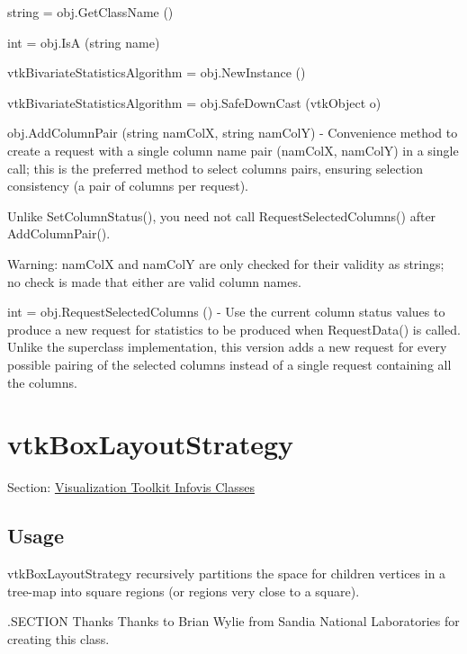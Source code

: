 \begin{DoxyItemize}
\item {\ttfamily string = obj.\-Get\-Class\-Name ()}  
\item {\ttfamily int = obj.\-Is\-A (string name)}  
\item {\ttfamily vtk\-Bivariate\-Statistics\-Algorithm = obj.\-New\-Instance ()}  
\item {\ttfamily vtk\-Bivariate\-Statistics\-Algorithm = obj.\-Safe\-Down\-Cast (vtk\-Object o)}  
\item {\ttfamily obj.\-Add\-Column\-Pair (string nam\-Col\-X, string nam\-Col\-Y)} -\/ Convenience method to create a request with a single column name pair ({\ttfamily nam\-Col\-X}, {\ttfamily nam\-Col\-Y}) in a single call; this is the preferred method to select columns pairs, ensuring selection consistency (a pair of columns per request).

Unlike Set\-Column\-Status(), you need not call Request\-Selected\-Columns() after Add\-Column\-Pair().

Warning\-: {\ttfamily nam\-Col\-X} and {\ttfamily nam\-Col\-Y} are only checked for their validity as strings; no check is made that either are valid column names.  
\item {\ttfamily int = obj.\-Request\-Selected\-Columns ()} -\/ Use the current column status values to produce a new request for statistics to be produced when Request\-Data() is called. Unlike the superclass implementation, this version adds a new request for every possible pairing of the selected columns instead of a single request containing all the columns.  
\end{DoxyItemize}\hypertarget{vtkinfovis_vtkboxlayoutstrategy}{}\section{vtk\-Box\-Layout\-Strategy}\label{vtkinfovis_vtkboxlayoutstrategy}
Section\-: \hyperlink{sec_vtkinfovis}{Visualization Toolkit Infovis Classes} \hypertarget{vtkwidgets_vtkxyplotwidget_Usage}{}\subsection{Usage}\label{vtkwidgets_vtkxyplotwidget_Usage}
vtk\-Box\-Layout\-Strategy recursively partitions the space for children vertices in a tree-\/map into square regions (or regions very close to a square).

.S\-E\-C\-T\-I\-O\-N Thanks Thanks to Brian Wylie from Sandia National Laboratories for creating this class.

